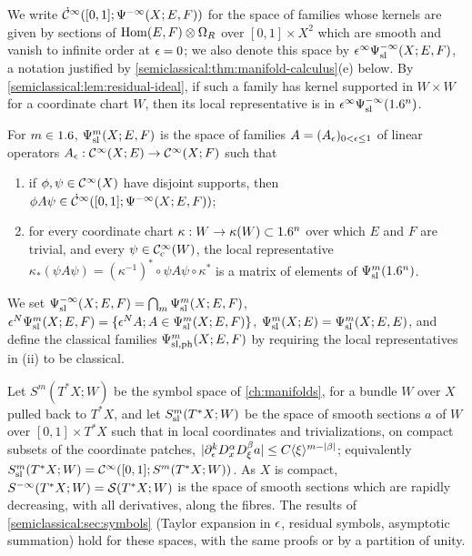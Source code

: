 We write $\dot{\mathcal{C}}^\infty([0,1];\Psi^{-\infty}(X;E,F))$ for the space of families whose
kernels are given by sections of $\operatorname{Hom}(E,F)\otimes\Omega_R$ over $[0,1]\times X^2$
which are smooth and vanish to infinite order at $\epsilon=0$; we also denote this
space by $\epsilon^\infty\Psi^{-\infty}_{\mathrm{sl}}(X;E,F)$, a notation justified by
\cref{semiclassical:thm:manifold-calculus}(e) below. By
\cref{semiclassical:lem:residual-ideal}, if such a family has kernel supported in
$W\times W$ for a coordinate chart $W$, then its local representative is in
$\epsilon^\infty\Psi^{-\infty}_{\mathrm{sl}}(1.6^n)$.

\begin{definition}\label{semiclassical:def:manifold}
  For $m\in1.6$, $\Psi^{m}_{\mathrm{sl}}(X;E,F)$ is the space of families $A=(A_\epsilon)_{0<\epsilon\le1}$
  of linear operators $A_\epsilon:\mathcal{C}^\infty(X;E)\to\mathcal{C}^\infty(X;F)$ such that
  \begin{enumerate}[label=\textup{(\roman*)}]
  \item if $\phi,\psi\in\mathcal{C}^\infty(X)$ have disjoint supports, then
    $\phi A\psi\in\dot{\mathcal{C}}^\infty([0,1];\Psi^{-\infty}(X;E,F))$;
  \item for every coordinate chart $\kappa:W\to\kappa(W)\subset1.6^n$ over which $E$ and
    $F$ are trivial, and every $\psi\in\mathcal{C}^\infty_{\mathrm{c}}(W)$, the local representative
    $\kappa_*(\psi A\psi)=(\kappa^{-1})^*\circ\psi A\psi\circ\kappa^*$ is a matrix of
    elements of $\Psi^{m}_{\mathrm{sl}}(1.6^n)$.
  \end{enumerate}
  We set $\Psi^{-\infty}_{\mathrm{sl}}(X;E,F)=\bigcap_m\Psi^{m}_{\mathrm{sl}}(X;E,F)$,
  $\epsilon^N\Psi^{m}_{\mathrm{sl}}(X;E,F)=\{\epsilon^NA;A\in\Psi^{m}_{\mathrm{sl}}(X;E,F)\}$, $\Psi^{m}_{\mathrm{sl}}(X;E)=\Psi^{m}_{\mathrm{sl}}(X;E,E)$,
  and define the classical families $\Psi^{m}_{\mathrm{sl,ph}}(X;E,F)$ by requiring the
  local representatives in (ii) to be classical.
\end{definition}

Let $S^m(T^*X;W)$ be the symbol space of \cref{ch:manifolds}, for a bundle $W$
over $X$ pulled back to $T^*X$, and let $S^{m}_{\mathrm{sl}}(T^*X;W)$ be the space of smooth
sections $a$ of $W$ over $[0,1]\times T^*X$ such that in local coordinates and
trivializations, on compact subsets of the coordinate patches,
$\lvert \partial^k_\epsilon D^\alpha_xD^\beta_\xi a\rvert\le C\langle \xi\rangle^{m-\lvert \beta\rvert}$; equivalently
$S^{m}_{\mathrm{sl}}(T^*X;W)=\mathcal{C}^\infty([0,1];S^m(T^*X;W))$. As $X$ is compact,
$S^{-\infty}(T^*X;W)=\mathcal{S}(T^*X;W)$ is the space of smooth sections which are
rapidly decreasing, with all derivatives, along the fibres. The results of
\cref{semiclassical:sec:symbols} (Taylor expansion in $\epsilon$, residual symbols,
asymptotic summation) hold for these spaces, with the same proofs or by a
partition of unity.

